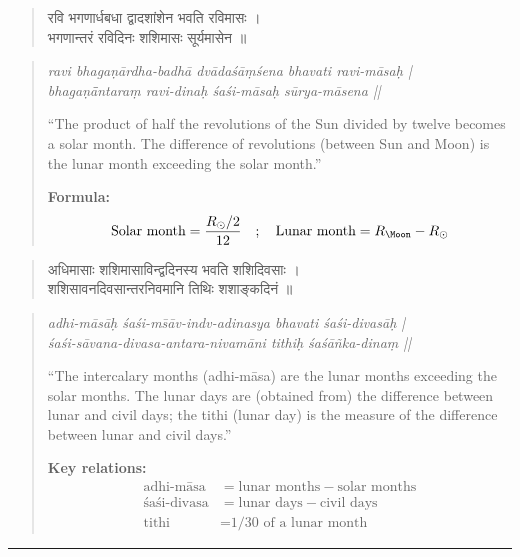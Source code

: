\documentclass[11pt,a4paper]{article}
\newcommand{\dev}[1]{{\devanagarifont #1}}
\theoremstyle{definition}
\begin{document}
\noindent
\begin{quote}
\dev{रवि भगणार्धबधा द्वादशांशेन भवति रविमासः ।\\
भगणान्तरं रविदिनः शशिमासः सूर्यमासेन ॥}
\end{quote}

\hfill\noindent
\begin{quote}
\textit{ravi bhaga\d{n}\=ardha-badh\=a dv\=ada\'{s}\=a\d{m}\'sena bhavati ravi-m\=asa\d{h} |\\
bhaga\d{n}\=\=antara\d{m} ravi-dina\d{h} \'{s}a\'{s}i-m\=asa\d{h} s\=urya-m\=asena ||}

``The product of half the revolutions of the Sun divided by twelve becomes a solar month. The difference of revolutions (between Sun and Moon) is the lunar month exceeding the solar month.''

\textbf{Formula:}
\[
\text{Solar month} = \frac{R_{\odot}/2}{12} \quad ; \quad \text{Lunar month} = R_{\Moon} - R_{\odot}
\]
\end{quote}

\noindent
\begin{quote}
\dev{अधिमासाः शशिमासाविन्द्वदिनस्य भवति शशिदिवसाः ।\\
शशिसावनदिवसान्तरनिवमानि तिथिः शशाङ्कदिनं ॥}
\end{quote}

\hfill\noindent
\begin{quote}
\textit{adhi-m\=as\=a\d{h} \'{s}a\'{s}i-m\=s\=av-indv-adinasya bhavati \'{s}a\'{s}i-divas\=a\d{h} |\\
\'{s}a\'{s}i-s\=avana-divasa-antara-nivam\=ani tithi\d{h} \'{s}a\'{s}\=a\~nka-dina\d{m} ||}

``The intercalary months (adhi-m\=asa) are the lunar months exceeding the solar months. The lunar days are (obtained from) the difference between lunar and civil days; the tithi (lunar day) is the measure of the difference between lunar and civil days.''

\textbf{Key relations:}
\begin{align*}
\text{adhi-m\=asa} &= \text{lunar months} - \text{solar months} \\
\text{\'{s}a\'{s}i-divasa} &= \text{lunar days} - \text{civil days} \\
\text{tithi} &= \text{1/30 of a lunar month}
\end{align*}
\end{quote}



\vspace{0.5cm}
\noindent\rule{\textwidth}{0.6pt}
\vspace{0.5cm}
\end{document}
